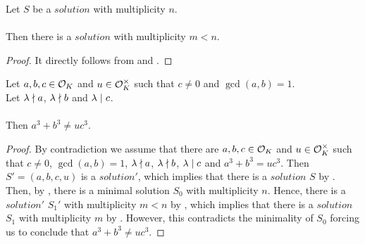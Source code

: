 \begin{theorem}
    \label{lmm:exists_Solution_multiplicity_lt}
    \leanok
    Let $S$ be a $solution$ with multiplicity $n$.\\\\
    Then there is a $solution$ with multiplicity $m<n$.
\end{theorem}
\begin{proof}
    \leanok
    It directly follows from  and
    .
\end{proof}

\begin{theorem}
    \label{thm:fermatLastTheoremForThreeGen}
    \leanok
    Let $a, b, c \in \mathcal{O}_K$ and $u \in \mathcal{O}^\times_K$ such that $c \neq 0$ and $\gcd(a,b)=1$.\\
    Let $\lambda \nmid a$, $\lambda \nmid b$ and $\lambda \mid c$. \\\\
    Then $a^3 + b^3 \neq u c^3$.
\end{theorem}
\begin{proof}
    \leanok
    By contradiction we assume that there are $a, b, c \in \mathcal{O}_K$ and $u \in \mathcal{O}^\times_K$
    such that $c \neq 0$, $\gcd(a,b)=1$, $\lambda \nmid a$, $\lambda \nmid b$,
    $\lambda \mid c$ and $a^3 + b^3 = u c^3$.
    Then $S'=(a,b,c,u)$ is a $solution'$, which implies that there is a $solution$ $S$ by
    .
    Then, by , there is a minimal solution $S_0$ with multiplicity $n$.
    Hence, there is a $solution'$ $S_1'$ with multiplicity $m<n$ by ,
    which implies that there is a $solution$ $S_1$  with multiplicity $m$ by .
    However, this contradicts the minimality of $S_0$
    forcing us to conclude that $a^3 + b^3 \neq u c^3$.
\end{proof}

